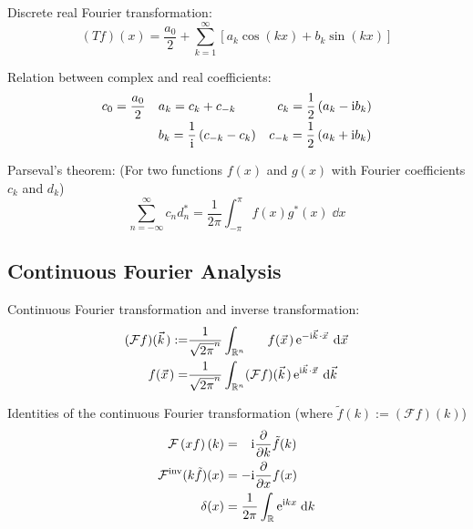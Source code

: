 			\noindent
			Discrete real Fourier transformation:
			\begin{equation}
				(Tf)(x)=\frac{a_0}{2}+\sum_{k=1}^{\infty}\left[a_k \cos(kx) + b_k \sin(kx) \right]
			\end{equation}

			\noindent
			Relation between complex and real coefficients:
			\begin{equation}
				\begin{array}{clc}
					c_0 = \dfrac{a_0}{2} & a_k = c_k+c_{-k} & \phantom{_{-}}c_k = \dfrac{1}{2}\left(a_k-\i b_k\right) \\ [6pt]
					& b_k = \dfrac{1}{\i}\left(c_{-k}-c_{k}\right) & c_{-k} = \dfrac{1}{2}\left(a_k+\i b_k\right) \\
				\end{array}
			\end{equation}

			\noindent
			Parseval's theorem: (For two functions $f(x)$ and $g(x)$ with Fourier coefficients $c_k$ and $d_k$)
			\begin{equation}
				\sum_{n=-\infty}^{\infty} c_n d_n^* = \frac{1}{2\pi}\int_{-\pi}^{\pi} f(x)g^*(x)\;\dd x
			\end{equation}

		\subsection{Continuous Fourier Analysis}
			\noindent
			Continuous Fourier transformation and inverse transformation:
			\begin{equation}
				\begin{aligned}
					(\mathcal{F}f)(\vec{k}) :=& \frac{1}{\sqrt{2\pi}^n}\int_{\mathbb{R}^n} \phantom{(\mathcal{F})}f(\vec{x})\, \ex^{-\i\vec{k}\cdot\vec{x}}\;\dd\vec{x} \\
					\phantom{(\mathcal{F})}f(\vec{x}) =& \frac{1}{\sqrt{2\pi}^n}\int_{\mathbb{R}^n} (\mathcal{F}f)(\vec{k}) \,\ex^{\i\vec{k}\cdot\vec{x}}\;\dd \vec{k} \\
				\end{aligned}
			\end{equation}

			\noindent
			Identities of the continuous Fourier transformation (where $\tilde{f}(k) := \left(\mathcal{F}f\right)(k)$)
			\begin{equation}
				\begin{aligned}
					\mathcal{F}\left(xf\right)(k) &= \phantom{-}\mathrm{i} \pdv{k}\tilde{f}(k) \\
					{\mathcal{F}}^\mathrm{inv}(k\tilde{f})(x) &= -\mathrm{i}\pdv{x}f(x) \\
					\delta(x) &= \frac{1}{2\pi}\int_{\mathbb{R}}\mathrm{e}^{\mathrm{i} kx}\;\dd k
					\label{Eq:FourierIdentities}
				\end{aligned}
			\end{equation}
			
